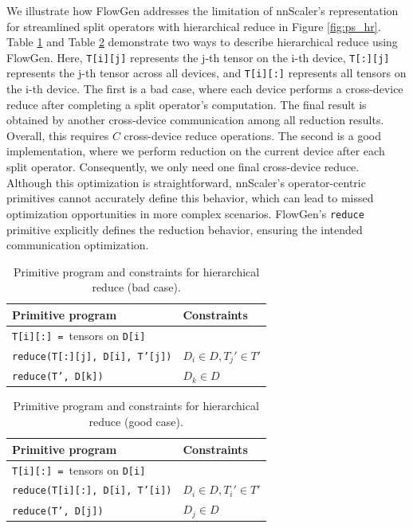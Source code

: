 We illustrate how FlowGen addresses the limitation of nnScaler's representation for streamlined split operators with hierarchical reduce in Figure \ref{fig:ps_hr}. Table \ref{tab:reduce_bad} and Table \ref{tab:reduce_good} demonstrate two ways to describe hierarchical reduce using FlowGen. Here, \texttt{T[i][j]} represents the j-th tensor on the i-th device, \texttt{T[:][j]} represents the j-th tensor across all devices, and \texttt{T[i][:]} represents all tensors on the i-th device. The first is a bad case, where each device performs a cross-device reduce after completing a split operator's computation. The final result is obtained by another cross-device communication among all reduction results. Overall, this requires $C$ cross-device reduce operations. The second is a good implementation, where we perform reduction on the current device after each split operator. Consequently, we only need one final cross-device reduce. Although this optimization is straightforward, nnScaler's operator-centric primitives cannot accurately define this behavior, which can lead to missed optimization opportunities in more complex scenarios. FlowGen's \texttt{reduce} primitive explicitly defines the reduction behavior, ensuring the intended communication optimization.

\begin{table}[h]
\centering
\footnotesize
\begin{tabular}{l|l}
\textbf{Primitive program} & \textbf{Constraints} \\
\hline
\texttt{T[i][:] = }tensors on \texttt{D[i]} & \\
\hline
\texttt{reduce(T[:][j], D[i], T'[j])} & $D_i \in D, T_j' \in T'$ \\
\texttt{reduce(T', D[k])} & $D_k \in D$ \\
\hline
\end{tabular}
\caption{Primitive program and constraints for hierarchical reduce (bad case).}
\label{tab:reduce_bad}
\end{table}

\begin{table}[h]
\centering
\footnotesize
\begin{tabular}{l|l}
\textbf{Primitive program} & \textbf{Constraints} \\
\hline
\texttt{T[i][:] = }tensors on \texttt{D[i]} & \\
\hline
\texttt{reduce(T[i][:], D[i], T'[i])} & $D_i \in D, T_i' \in T'$ \\
\texttt{reduce(T', D[j])} & $D_j \in D$ \\
\hline
\end{tabular}
\caption{Primitive program and constraints for hierarchical reduce (good case).}
\label{tab:reduce_good}
\end{table}



